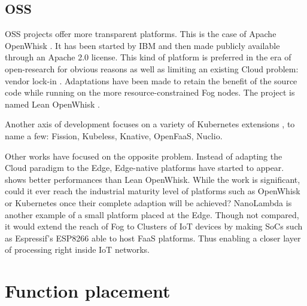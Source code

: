 \documentclass[11pt]{sdm}
\begin{document}
%    

\hypersetup{linkcolor=}
\subsection{\acrfull{OSS}}
\gls{OSS} projects offer more transparent platforms. This is the case of Apache OpenWhisk \cite{noauthor_apache_nodate}. It has been started by IBM and then made publicly available through an Apache 2.0 license. This kind of platform is preferred in the era of open-research for obvious reasons as well as limiting an existing Cloud problem: vendor lock-in \cite{kjorveziroski_iot_2021}. Adaptations have been made to retain the benefit of the source code while running on the more resource-constrained Fog nodes. The project is named Lean OpenWhisk \cite{breitgand_lean_2018}.

Another axis of development focuses on a variety of Kubernetes extensions \cite{bocci_secure_2021}, to name a few: Fission, Kubeless, Knative, OpenFaaS, Nuclio.

Other works have focused on the opposite problem. Instead of adapting the Cloud paradigm to the Edge, Edge-native platforms have started to appear. \citet{pfandzelter_tinyfaas_2020} shows better performances than Lean OpenWhisk. While the work is significant, could it ever reach the industrial maturity level of platforms such as OpenWhisk or Kubernetes once their complete adaption will be achieved?  NanoLambda is another example of a small platform placed at the Edge. Though not compared, it would extend the reach of Fog to Clusters of IoT devices by making \glspl{SoC} such as Espressif's ESP8266 \cite{noauthor_esp8266_nodate} able to host \gls{FaaS} platforms. Thus enabling a closer layer of processing right inside \gls{IoT} networks.

\section{Function placement}
\label{sec:placement}
\end{document}
